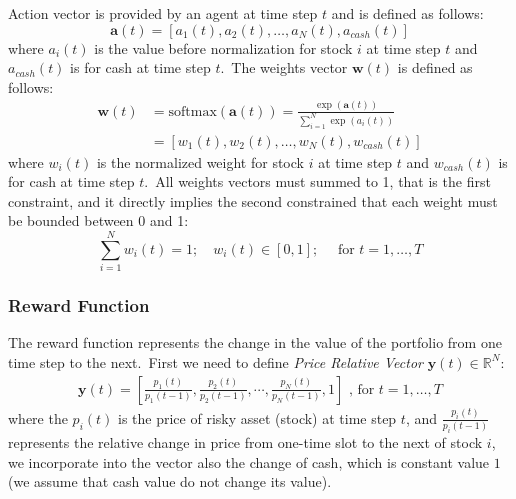 \documentclass[../xlapes02]{subfiles}
\begin{document}
    Action vector is provided by an agent at time step $t$ and is defined as follows:
    \begin{equation}
        \label{eq:action-vector}
        \bm{a}(t) = [a_1(t), a_2(t), \ldots, a_N(t), a_{cash}(t)]
    \end{equation}
    where $a_i(t)$ is the value before normalization for stock $i$ at time step $t$ and $a_{cash}(t)$ is for cash at time step $t$.\ The weights vector $\bm{w}(t)$ is defined as follows:
    \begin{equation}
        \label{eq:weights-vector}
        \begin{split}
            \bm{w}(t) &= \text{softmax}(\bm{a}(t)) = \frac{\exp(\bm{a}(t))}{\sum_{i=1}^{N}\exp(a_i(t))} \\
            &= [w_1(t), w_2(t), \ldots, w_N(t), w_{cash}(t)]
        \end{split}
    \end{equation}
    where $w_i(t)$ is the normalized weight for stock $i$ at time step $t$ and $w_{cash}(t)$ is for cash at time step $t$.\ All weights vectors must summed to 1, that is the first constraint, and it directly implies the second constrained that each weight must be bounded between 0 and 1:
    \begin{equation}
        \label{eq:equation-constraint}
        \sum_{i=1}^{N}w_i(t)=1;\quad w_i(t)\in[0,1];\quad\text{ for }t=1,\ldots,T
    \end{equation}


    \subsubsection{Reward Function}\label{subsubsec:reward-function-portfolio}
    The reward function represents the change in the value of the portfolio from one time step to the next.\ First we need to define \emph{Price Relative Vector} $\bm{y}(t) \in \mathbb{R}^N$:
    \begin{equation}
        \label{eq:price-relative-vector}
        \begin{split}
            \bm{y}(t)=\left[\frac{p_1(t)}{p_1(t-1)}, \frac{p_2(t)}{p_2(t-1)}, \cdots, \frac{p_N(t)}{p_N(t-1)}, 1\right]\text{ , for }t=1,\ldots,T
        \end{split}
    \end{equation}
    where the $p_i(t)$ is the price of risky asset (stock) at time step $t$, and $\frac{p_i(t)}{p_i(t-1)}$ represents the relative change in price from one-time slot to the next of stock $i$, we incorporate into the vector also the change of cash, which is constant value $1$ (we assume that cash value do not change its value).
\end{document}
